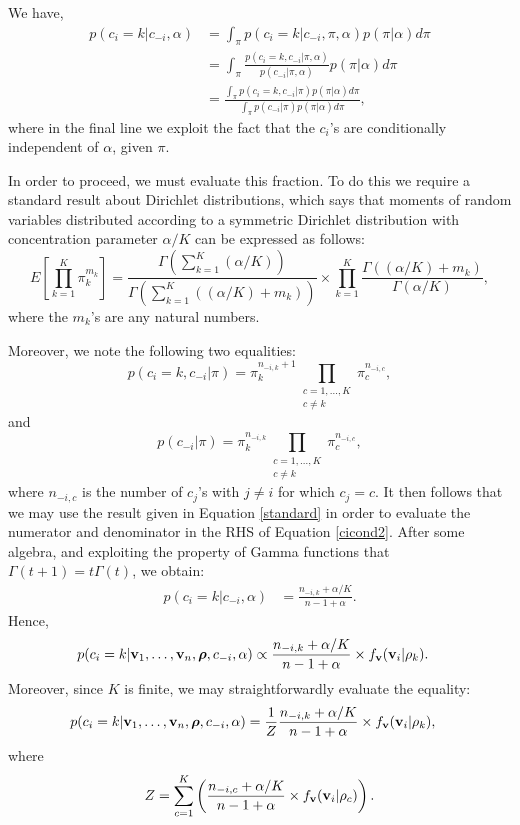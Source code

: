 \documentclass[fleqn,11pt]{wlscirep}
\begin{document}
We have,
\begin{align}
p(c_i=k|c_{-i}, \alpha) &= \int_\pi p(c_i=k|c_{-i}, \pi, \alpha) p(\pi|\alpha)d\pi\\
&= \int_\pi \frac{p(c_i=k,c_{-i}| \pi, \alpha)}{p(c_{-i}| \pi, \alpha)} p(\pi|\alpha) d\pi\\
&= \frac{\int_\pi p(c_i=k,c_{-i}| \pi)p(\pi|\alpha)d\pi}{ \int_\pi p(c_{-i}| \pi)p(\pi|\alpha)d\pi}, \label{cicond2}  
\end{align}
where in the final line we exploit the fact that the $c_i$'s are conditionally independent of $\alpha$, given $\pi$.

In order to proceed, we must evaluate this fraction.  To do this we require a standard result about Dirichlet distributions, which says that moments of random variables distributed according to a symmetric Dirichlet distribution with concentration parameter $\alpha/K$ can be expressed as follows:
\begin{equation}
E\left[\prod_{k = 1}^K \pi_k^{m_k} \right] = \frac{\Gamma(\sum_{k=1}^K (\alpha/K))}{\Gamma(\sum_{k=1}^K ((\alpha/K) + m_k))}\times \prod_{k=1}^K \frac{\Gamma ((\alpha/K) + m_k)}{\Gamma(\alpha/K)},\label{standard}
\end{equation}
where the $m_k$'s are any natural numbers. 

Moreover, we note the following two equalities: 
$$p(c_i = k, c_{-i}| \pi) = \pi_k^{n_{-i,k} + 1}\prod_{\substack{c= 1,\ldots,K\\
                  c \ne k}} \pi_c^{n_{-i,c}}, $$
                  and
$$p(c_{-i}| \pi) = \pi_k^{n_{-i,k}}\prod_{\substack{c= 1,\ldots,K\\
                  c \ne k}} \pi_c^{n_{-i,c}}, $$
where $n_{-i,c}$ is the number of $c_j$'s with $j \ne i$ for which $c_j = c$.  It then follows that we may use the result given in Equation \eqref{standard} in order to evaluate the numerator and denominator in the RHS of Equation \eqref{cicond2}.  After some algebra, and exploiting the property of Gamma functions that $\Gamma(t+1) = t\Gamma(t)$, we obtain:
\begin{align}
p(c_i=k|c_{-i}, \alpha) &= \frac{n_{-i,k} + \alpha/K}{n - 1 + \alpha}. \label{cicond3}  
\end{align}
Hence,
\begin{align}
p(c_i = k| {\bf v}_1,\ldots, {\bf v}_n,\boldsymbol{\rho}, c_{-i}, \alpha) &\propto  \frac{n_{-i,k} + \alpha/K}{n - 1 + \alpha} \times f_{\bf v}({\bf v}_i | \rho_k).
\end{align}
Moreover, since $K$ is finite, we may straightforwardly evaluate the equality:
\begin{align}
p(c_i = k| {\bf v}_1,\ldots, {\bf v}_n,\boldsymbol{\rho}, c_{-i}, \alpha) &= \frac{1}{Z} \frac{n_{-i,k} + \alpha/K}{n - 1 + \alpha} \times f_{\bf v}({\bf v}_i | \rho_k),\label{finite_nomarg}
\end{align} 
where
\begin{equation}
Z = \sum_{c =1}^K \left(\frac{n_{-i,c} + \alpha/K}{n - 1 + \alpha} \times f_{\bf v}({\bf v}_i | \rho_c)\right).  
\end{equation}
\end{document}

